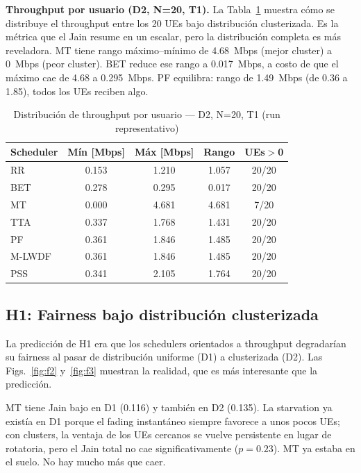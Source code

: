 \documentclass[conference]{IEEEtran}
\begin{document}
\textbf{Throughput por usuario (D2, N=20, T1).} La Tabla~\ref{tab:per_ue} muestra
cómo se distribuye el throughput entre los 20 UEs bajo distribución clusterizada.
Es la métrica que el Jain resume en un escalar, pero la distribución completa es más
reveladora. MT tiene rango máximo--mínimo de 4.68~Mbps (mejor cluster) a 0~Mbps (peor
cluster). BET reduce ese rango a 0.017~Mbps, a costo de que el máximo cae de 4.68 a
0.295~Mbps. PF equilibra: rango de 1.49~Mbps (de 0.36 a 1.85), todos los UEs
reciben algo.

\begin{table}[t]
  \centering
  \caption{Distribución de throughput por usuario --- D2, N=20, T1 (run representativo)}
  \label{tab:per_ue}
  \footnotesize
  \begin{tabular}{@{}lcccc@{}}
    \toprule
    \textbf{Scheduler} & \textbf{Mín [Mbps]} & \textbf{Máx [Mbps]} & \textbf{Rango} & \textbf{UEs$>$0} \\
    \midrule
    RR     & 0.153 & 1.210 & 1.057 & 20/20 \\
    BET    & 0.278 & 0.295 & 0.017 & 20/20 \\
    MT     & 0.000 & 4.681 & 4.681 & 7/20  \\
    TTA    & 0.337 & 1.768 & 1.431 & 20/20 \\
    PF     & 0.361 & 1.846 & 1.485 & 20/20 \\
    M-LWDF & 0.361 & 1.846 & 1.485 & 20/20 \\
    PSS    & 0.341 & 2.105 & 1.764 & 20/20 \\
    \bottomrule
  \end{tabular}
\end{table}

\subsection{H1: Fairness bajo distribución clusterizada}

La predicción de H1 era que los schedulers orientados a throughput degradarían su
fairness al pasar de distribución uniforme (D1) a clusterizada (D2). Las Figs.~\ref{fig:f2}
y~\ref{fig:f3} muestran la realidad, que es más interesante que la predicción.

MT tiene Jain bajo en D1 (0.116) y también en D2 (0.135). La starvation ya existía en D1
porque el fading instantáneo siempre favorece a unos pocos UEs; con clusters, la
ventaja de los UEs cercanos se vuelve persistente en lugar de rotatoria, pero el Jain
total no cae significativamente ($p=0.23$). MT ya estaba en el suelo. No hay mucho
más que caer.
\end{document}
